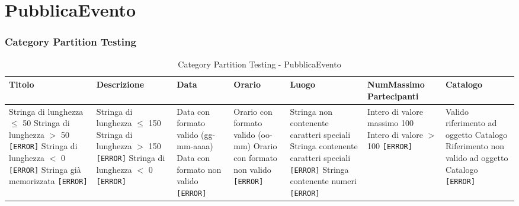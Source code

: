 \section{PubblicaEvento}
\subsubsection*{Category Partition Testing}
\begin{table}[H]
	\centering
	\footnotesize
	\renewcommand{\arraystretch}{1.3}
	\begin{tabular}{|p{2.2cm}|p{2.2cm}|p{2.2cm}|p{2.2cm}|p{2.2cm}|p{2.2cm}|p{2.2cm}|}
		\hline
		\textbf{Titolo} & \textbf{Descrizione} & \textbf{Data} & \textbf{Orario} & \textbf{Luogo} & \textbf{NumMassimo Partecipanti} & \textbf{Catalogo} \\
		\hline
		Stringa di lunghezza $\leq$ 50 \newline
		Stringa di lunghezza $>$ 50 \texttt{[ERROR]} \newline
		Stringa di lunghezza $<$ 0 \texttt{[ERROR]} \newline
		Stringa già memorizzata \texttt{[ERROR]} &

		Stringa di lunghezza $\leq$ 150 \newline
		Stringa di lunghezza $>$ 150 \texttt{[ERROR]} \newline
		Stringa di lunghezza $<$ 0 \texttt{[ERROR]} &

		Data con formato valido (gg-mm-aaaa) \newline
		Data con formato non valido \texttt{[ERROR]} &

		Orario con formato valido (oo-mm) \newline
		Orario con formato non valido \texttt{[ERROR]} &

		Stringa non contenente caratteri speciali \newline
		Stringa contenente caratteri speciali \texttt{[ERROR]} \newline
		Stringa contenente numeri \texttt{[ERROR]} &

		Intero di valore massimo 100 \newline
		Intero di valore $>$ 100 \texttt{[ERROR]} &

		Valido riferimento ad oggetto Catalogo \newline
		Riferimento non valido ad oggetto Catalogo \texttt{[ERROR]} \\
		\hline
	\end{tabular}
	\caption{Category Partition Testing - PubblicaEvento}
\end{table}

